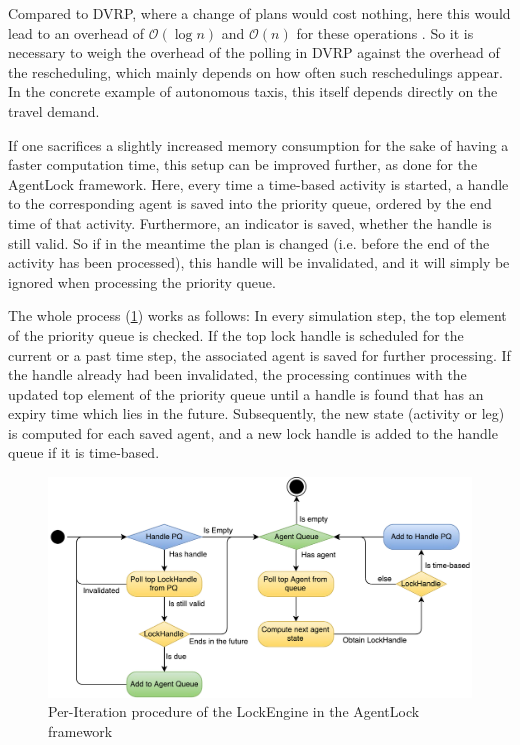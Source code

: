 Compared to DVRP, where a change of plans would cost nothing, here this would lead
to an overhead of $\mathcal{O}(\log n)$ and $\mathcal{O}(n)$ for these operations \citep{JavaPQ}.
So it is necessary to weigh the overhead of the polling in DVRP against the overhead
of the rescheduling, which mainly depends on how often such reschedulings appear. In
the concrete example of autonomous taxis, this itself depends directly on the travel
demand.

If one sacrifices a slightly increased memory consumption for the sake of having a faster
computation time, this setup can be improved further, as done for the AgentLock
framework. Here, every time a time-based activity is started, a handle to the
corresponding agent is saved into the priority queue, ordered by the end time of
that activity. Furthermore, an indicator is saved, whether the handle is still valid.
So if in the meantime the plan is changed (i.e. before the end of the activity has been processed),
this handle will be invalidated, and it will simply be ignored when processing the priority queue.

The whole process (\cref{fig:lockengine}) works as follows: In every simulation step, the top element of
the priority queue is checked. If the top lock handle is scheduled for the current or a past time
step, the associated agent is saved for further processing. If the handle already had been invalidated, the processing continues with the
updated top element of the priority queue until a handle is found that has an expiry
time which lies in the future. Subsequently, the new state (activity or leg) is
computed for each saved agent, and a new lock handle is added to the handle queue if it
is time-based.

\begin{figure}
    \centering
    \includegraphics[width=1.0\textwidth]{figures/lockengine.pdf}
    \caption{Per-Iteration procedure of the LockEngine in the AgentLock framework}
    \label{fig:lockengine}
\end{figure}

